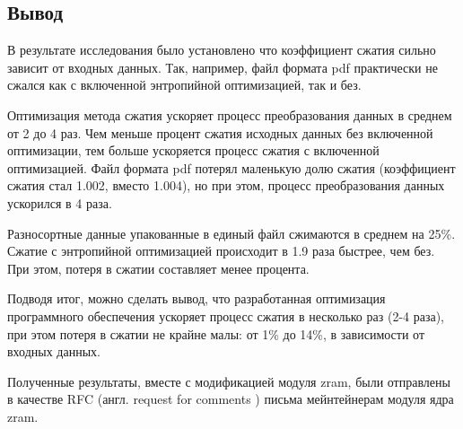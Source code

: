 \subsection{Вывод}

В результате исследования было установлено что коэффициент сжатия сильно зависит от входных данных. Так, например, файл формата pdf практически не сжался как с включенной энтропийной оптимизацией, так и без.

Оптимизация метода сжатия ускоряет процесс преобразования данных в среднем от 2 до 4 раз. Чем меньше процент сжатия исходных данных без включенной оптимизации, тем больше ускоряется процесс сжатия с включенной оптимизацией. Файл формата pdf потерял маленькую долю сжатия (коэффициент сжатия стал 1.002, вместо 1.004), но при этом, процесс преобразования данных ускорился в 4 раза.

Разносортные данные упакованные в единый файл сжимаются в среднем на 25\%. Сжатие с энтропийной оптимизацией происходит в 1.9 раза быстрее, чем без. При этом, потеря в сжатии составляет менее процента.

Подводя итог, можно сделать вывод, что разработанная оптимизация программного обеспечения ускоряет процесс сжатия в несколько раз (2-4 раза), при этом потеря в сжатии не крайне малы: от 1\% до 14\%, в зависимости от входных данных. 

Полученные результаты, вместе с модификацией модуля zram, были отправлены в качестве RFC (англ. request for comments \cite{rfc}) письма мейнтейнерам модуля ядра zram.

\pagebreak